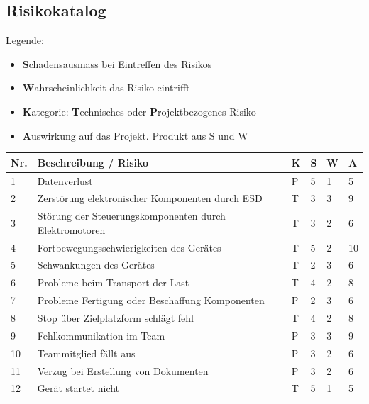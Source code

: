 \documentclass[a4paper]{report}
\begin{document}
\subsection{Risikokatalog}
\label{sec:Risikokatalog}
Legende:
\begin{itemize}
	\item \textbf{S}chadensausmass bei Eintreffen des Risikos
	\item \textbf{W}ahrscheinlichkeit das Risiko eintrifft
	\item \textbf{K}ategorie: \textbf{T}echnisches oder \textbf{P}rojektbezogenes Risiko
	\item \textbf{A}uswirkung auf das Projekt. Produkt aus S und W
\end{itemize}

\vspace{1em}
\noindent
\begin{tabular}{|p{}|p{}|p{}|p{}|p{}||p{}|}
	\hline
	\textbf{Nr.} & \textbf{Beschreibung / Risiko} & \textbf{K} & \textbf{S} & \textbf{W} & \textbf{A} \\
	\hline
	1 & Datenverlust & P & 5 & 1 & 5\\
	\hline
	2 & Zerstörung elektronischer Komponenten durch ESD & T & 3 & 3 & 9 \\
	\hline
	3 & Störung der Steuerungskomponenten durch Elektromotoren & T & 3 & 2 & 6 \\
	\hline
	4 & Fortbewegungsschwierigkeiten des Gerätes & T & 5 & 2 & 10 \\
	\hline
	5 & Schwankungen des Gerätes & T & 2 & 3 & 6 \\
	\hline
	6 & Probleme beim Transport der Last & T & 4 & 2 & 8 \\
	\hline
	7 & Probleme Fertigung oder Beschaffung Komponenten & P & 2 & 3 & 6 \\
	\hline
	8 & Stop über Zielplatzform schlägt fehl & T & 4 & 2 & 8 \\
	\hline
	9 & Fehlkommunikation im Team & P & 3 & 3 & 9 \\
	\hline
	10 & Teammitglied fällt aus & P & 3 & 2 & 6 \\
	\hline
	11 & Verzug bei Erstellung von Dokumenten & P & 3 & 2 & 6 \\
	\hline
	12 & Gerät startet nicht & T & 5 & 1 & 5 \\
	\hline
\end{tabular}
\end{document}
